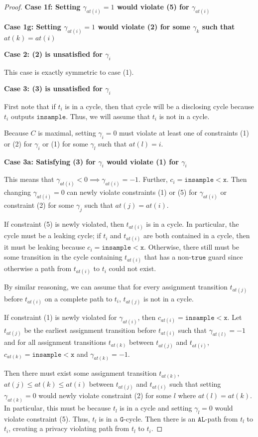 \documentclass[12pt]{article}
\newcommand{\lguard}[1][x]{\texttt{insample} < #1}
\theoremstyle{definition}
\begin{document}
\begin{proof}
    \textbf{Case 1f: Setting $\gamma_{at(i)}=1$ would violate (5) for $\gamma_{at(i)}$}

    \textbf{Case 1g: Setting $\gamma_{at(i)}=1$ would violate (2) for some $\gamma_k$ such that $at(k)= at(i)$}

    \textbf{Case 2: (2) is unsatisfied for $\gamma_i$}

    This case is exactly symmetric to case (1).

    \textbf{Case 3: (3) is unsatisfied for $\gamma_i$}

    First note that if $t_i$ is in a cycle, then that cycle will be a disclosing cycle because $t_i$ outputs $\texttt{insample}$. Thus, we will assume that $t_i$ is not in a cycle.

    Because $C$ is maximal, setting $\gamma_i=0$ must violate at least one of constraints (1) or (2) for $\gamma_i$ or (1) for some $\gamma_l$ such that $at(l) = i$.

    \textbf{Case 3a: Satisfying (3) for $\gamma_i$ would violate (1) for $\gamma_i$}

    This means that $\gamma_{at(i)}<0\implies \gamma_{at(i)} = -1$. Further, $c_i = \lguard[\texttt{x}]$. Then changing $\gamma_{at(i)}=0$ can newly violate constraints (1) or (5) for $\gamma_{at(i)}$ or constraint (2) for some $\gamma_j$ such that $at(j) = at(i)$.

    If constraint (5) is newly violated, then $t_{at(i)}$ is in a cycle. In particular, the cycle must be a leaking cycle; if $t_i$ and $t_{at(i)}$ are both contained in a cycle, then it must be leaking because $c_i = \lguard[\texttt{x}]$. Otherwise, there still must be some transition in the cycle containing $t_{at(i)}$ that has a non-$\texttt{true}$ guard since otherwise a path from $t_{at(i)}$ to $t_i$ could not exist. 

    By similar reasoning, we can assume that for every assignment transition $t_{at(j)}$before $t_{at(i)}$ on a complete path to $t_i$, $t_{at(j)}$ is not in a cycle. 

    If constraint (1) is newly violated for $\gamma_{at(i)}$, then $c_{at(i)} = \lguard[\texttt{x}]$. Let $t_{at(j)}$ be the earliest assignment transition before $t_{at(i)}$ such that $\gamma_{at(l)} = -1$ and for all assignment transitions $t_{at(k)}$ between $t_{at(j)}$ and $t_{at(i)}$, $c_{at(k)} = \lguard[\texttt{x}]$ and $\gamma_{at(k)} = -1$. 
    
    Then there must exist some assignment transition $t_{at(k)}$, $at(j)\leq at(k)\leq at(i)$ between $t_{at(j)}$ and $t_{at(i)}$ such that setting $\gamma_{at(k)} = 0$ would newly violate constraint (2) for some $l$ where $at(l) = at(k)$. In particular, this must be because $t_l$ is in a cycle and setting $\gamma_l = 0$ would violate constraint (5). Thus, $t_l$ is in a $\texttt{G}$-cycle. Then there is an $\texttt{AL}$-path from $t_l$ to $t_i$, creating a privacy violating path from $t_l$ to $t_i$. 


\end{proof}
\end{document}
